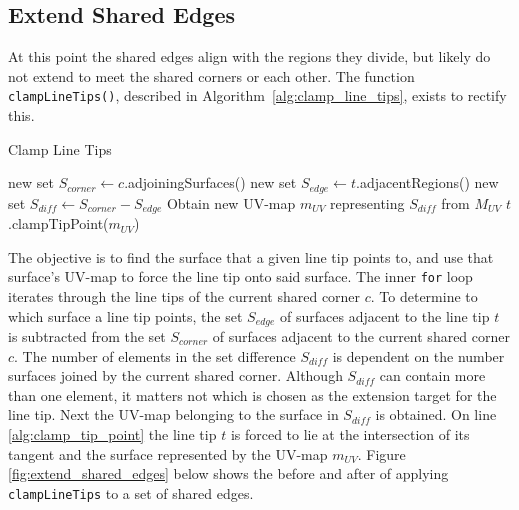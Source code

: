 \subsection{Extend Shared Edges}\label{sec:extend_shared_edges}
At this point the shared edges align with the regions they divide, but likely do not extend to meet the shared corners or each other.
The function \verb|clampLineTips()|, described in Algorithm~\ref{alg:clamp_line_tips}, exists to rectify this.

\begin{algorithm}[htb]
\caption{Clamp Line Tips}\label{alg:clamp_line_tips}
\begin{algorithmic}[1]
		\State new set $S_{corner} \leftarrow c$.adjoiningSurfaces() 
			\State new set $S_{edge} \leftarrow t$.adjacentRegions() %
			\State new set $S_{diff} \leftarrow S_{corner} - S_{edge}$ 
			\State Obtain new UV-map $m_{UV}$ representing $S_{diff}$ from $M_{UV}$
			\State $t$.clampTipPoint($m_{UV}$)\label{alg:clamp_tip_point}
		\EndFor
	\EndFor
\EndFunction
\end{algorithmic}
\end{algorithm}

The objective is to find the surface that a given line tip points to, and use that surface's UV-map to force the line tip onto said surface.
The inner \verb|for| loop iterates through the line tips of the current shared corner $c$.
To determine to which surface a line tip points, the set $S_{edge}$ of surfaces adjacent to the line tip $t$ is subtracted from the set $S_{corner}$ of surfaces adjacent to the current shared corner $c$.
The number of elements in the set difference $S_{diff}$ is dependent on the number surfaces joined by the current shared corner.
Although $S_{diff}$ can contain more than one element, it matters not which is chosen as the extension target for the line tip.
Next the UV-map belonging to the surface in $S_{diff}$ is obtained.
On line \ref{alg:clamp_tip_point} the line tip $t$ is forced to lie at the intersection of its tangent and the surface represented by the UV-map $m_{UV}$.
Figure \ref{fig:extend_shared_edges} below shows the before and after of applying \verb|clampLineTips| to a set of shared edges.

